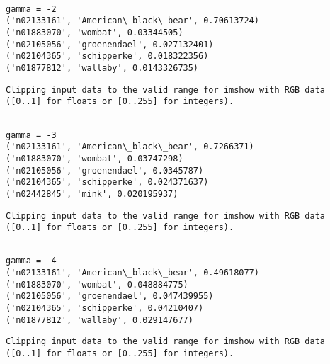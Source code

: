\documentclass[11pt]{article}
\begin{document}
    \begin{Verbatim}[commandchars=\\\{\}]

gamma = -2
('n02133161', 'American\_black\_bear', 0.70613724)
('n01883070', 'wombat', 0.03344505)
('n02105056', 'groenendael', 0.027132401)
('n02104365', 'schipperke', 0.018322356)
('n01877812', 'wallaby', 0.0143326735)

    \end{Verbatim}

    \begin{Verbatim}[commandchars=\\\{\}]
Clipping input data to the valid range for imshow with RGB data ([0..1] for floats or [0..255] for integers).

    \end{Verbatim}

    \begin{Verbatim}[commandchars=\\\{\}]

gamma = -3
('n02133161', 'American\_black\_bear', 0.7266371)
('n01883070', 'wombat', 0.03747298)
('n02105056', 'groenendael', 0.0345787)
('n02104365', 'schipperke', 0.024371637)
('n02442845', 'mink', 0.020195937)

    \end{Verbatim}

    \begin{Verbatim}[commandchars=\\\{\}]
Clipping input data to the valid range for imshow with RGB data ([0..1] for floats or [0..255] for integers).

    \end{Verbatim}

    \begin{Verbatim}[commandchars=\\\{\}]

gamma = -4
('n02133161', 'American\_black\_bear', 0.49618077)
('n01883070', 'wombat', 0.048884775)
('n02105056', 'groenendael', 0.047439955)
('n02104365', 'schipperke', 0.04210407)
('n01877812', 'wallaby', 0.029147677)

    \end{Verbatim}

    \begin{Verbatim}[commandchars=\\\{\}]
Clipping input data to the valid range for imshow with RGB data ([0..1] for floats or [0..255] for integers).

    \end{Verbatim}
\end{document}

